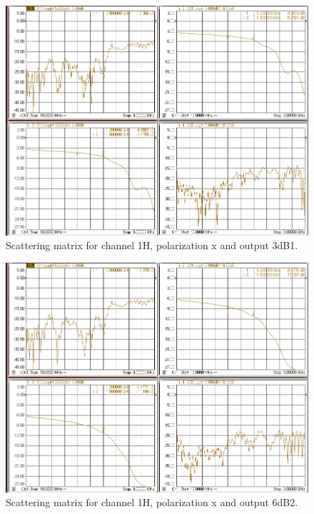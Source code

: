 \documentclass[12pt,a4paper,oneside]{article}
\begin{document}
\begin{figure}[H]
\centering
\includegraphics[width=0.9\linewidth]{VNA_results/1Hx_3dB1.png}
\caption{Scattering matrix for channel 1H, polarization x and output 3dB1.}
\label{fig:1Hx_3dB1}
\end{figure}


\begin{figure}[H]
\centering
\includegraphics[width=0.9\linewidth]{VNA_results/1Hx_6dB2.png}
\caption{Scattering matrix for channel 1H, polarization x and output 6dB2.}
\label{fig:1Hx_6dB2}
\end{figure}
\end{document}
